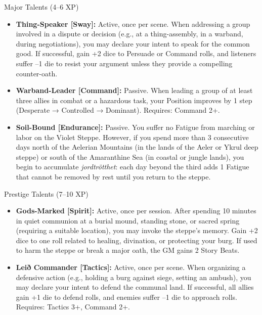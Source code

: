 \documentclass[12pt]{article}
\begin{document}
\begin{mechanic}{Major Talents (4--6 XP)}
  \begin{itemize}[leftmargin=*]
    \item \textbf{Thing-Speaker [Sway]:} Active, once per scene. When addressing a group involved in a dispute or decision (e.g., at a thing-assembly, in a warband, during negotiations), you may declare your intent to speak for the common good. If successful, gain +2 dice to Persuade or Command rolls, and listeners suffer --1 die to resist your argument unless they provide a compelling counter-oath.
    \item \textbf{Warband-Leader [Command]:} Passive. When leading a group of at least three allies in combat or a hazardous task, your Position improves by 1 step (Desperate → Controlled → Dominant). Requires: Command 2+.
    \item \textbf{Soil-Bound [Endurance]:} Passive. You suffer no Fatigue from marching or labor on the Violet Steppe. However, if you spend more than 3 consecutive days north of the Aelerian Mountains (in the lands of the Aeler or Ykrul deep steppe) or south of the Amaranthine Sea (in coastal or jungle lands), you begin to accumulate \textit{jordtrötthet}: each day beyond the third adds 1 Fatigue that cannot be removed by rest until you return to the steppe.
  \end{itemize}
\end{mechanic}

\begin{mechanic}{Prestige Talents (7--10 XP)}
  \begin{itemize}[leftmargin=*]
    \item \textbf{Gods-Marked [Spirit]:} Active, once per session. After spending 10 minutes in quiet communion at a burial mound, standing stone, or sacred spring (requiring a suitable location), you may invoke the steppe's memory. Gain +2 dice to one roll related to healing, divination, or protecting your burg. If used to harm the steppe or break a major oath, the GM gains 2 Story Beats.
    \item \textbf{Leið Commander [Tactics]:} Active, once per scene. When organizing a defensive action (e.g., holding a burg against siege, setting an ambush), you may declare your intent to defend the communal land. If successful, all allies gain +1 die to defend rolls, and enemies suffer --1 die to approach rolls. Requires: Tactics 3+, Command 2+.
  \end{itemize}
\end{mechanic}
\end{document}
